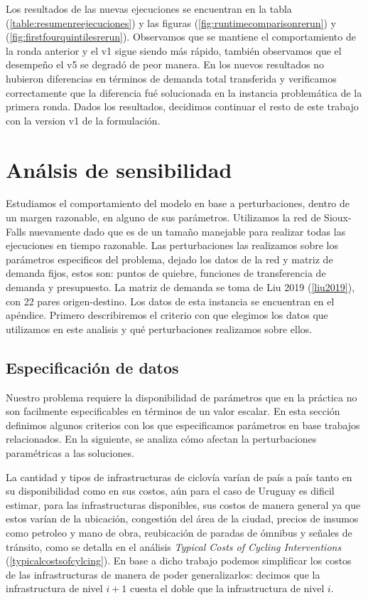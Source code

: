 \documentclass{article}
\begin{document}
  Los resultados de las nuevas ejecuciones se encuentran en la tabla (\ref{table:resumenreejecuciones}) y las figuras (\ref{fig:runtimecomparisonrerun}) y (\ref{fig:firstfourquintilesrerun}). Observamos que se mantiene el comportamiento de la ronda anterior y el v1 sigue siendo más rápido, también observamos que el desempeño el v5 se degradó de peor manera. En los nuevos resultados no hubieron diferencias en términos de demanda total transferida y verificamos correctamente que la diferencia fué solucionada en la instancia problemática de la primera ronda. Dados los resultados, decidimos continuar el resto de este trabajo con la version v1 de la formulación.


  \section{Análsis de sensibilidad}

  Estudiamos el comportamiento del modelo en base a perturbaciones, dentro de un margen razonable, en alguno de sus parámetros. Utilizamos la red de Sioux-Falls nuevamente dado que es de un tamaño manejable para realizar todas las ejecuciones en tiempo razonable. Las perturbaciones las realizamos sobre los parámetros especificos del problema, dejado los datos de la red y matriz de demanda fijos, estos son: puntos de quiebre, funciones de transferencia de demanda y presupuesto. La matriz de demanda se toma de Liu 2019 (\ref{liu2019}), con 22 pares origen-destino. Los datos de esta instancia se encuentran en el apéndice. Primero describiremos el criterio con que elegimos los datos que utilizamos en este analisis y qué perturbaciones realizamos sobre ellos.

  \subsection{Especificación de datos}

  Nuestro problema requiere la disponibilidad de parámetros que en la práctica no son facilmente especificables en términos de un valor escalar. En esta sección definimos algunos criterios con los que especificamos parámetros en base trabajos relacionados. En la siguiente, se analiza cómo afectan la perturbaciones paramétricas a las soluciones.

  La cantidad y tipos de infrastructuras de ciclovía varían de país a país tanto en su disponibilidad como en sus costos, aún para el caso de Uruguay es dificil estimar, para las infrastructuras disponibles, sus costos de manera general ya que estos varían de la ubicación, congestión del área de la ciudad, precios de insumos como petroleo y mano de obra, reubicación de paradas de ómnibus y señales de tránsito, como se detalla en el análisis {\it Typical Costs of Cycling Interventions} (\ref{typicalcostsofcylcing}). En base a dicho trabajo podemos simplificar los costos de las infrastructuras de manera de poder generalizarlos: decimos que la infrastructura de nivel $i+1$ cuesta el doble que la infrastructura de nivel $i$.
\end{document}
